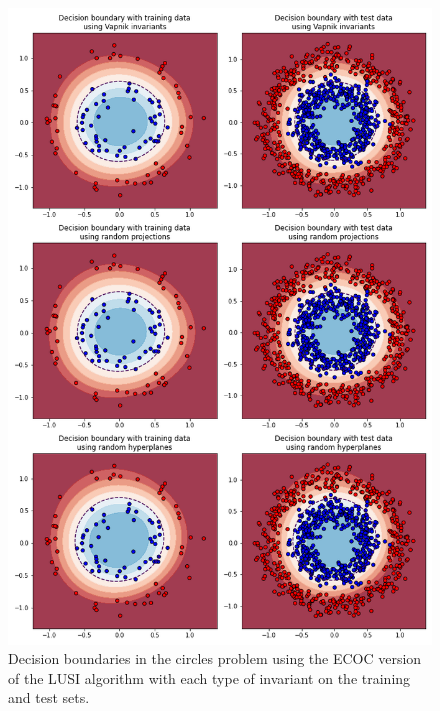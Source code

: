 \begin{figure}[H]
    \centering
    \includegraphics[width=\textwidth]{thesis/Figures/circles_decision_boundaries_ecoc.png}
    \caption{Decision boundaries in the circles problem using the ECOC version of the LUSI algorithm with each type
    of invariant on the training and test sets.}
    \label{fig:circles_decision_boundary_ecoc}
\end{figure}

